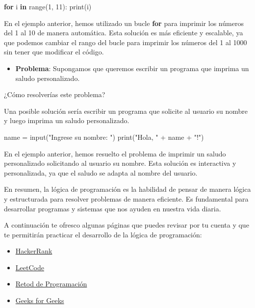\documentclass[
  a4paper,
  DIV=11,
  numbers=noendperiod,
  onepage,
  openany]{scrreprt}
\newenvironment{Shaded}{\begin{snugshade}}{\end{snugshade}}
\newcommand{\BuiltInTok}[1]{\textcolor[rgb]{0.00,0.23,0.31}{#1}}
\newcommand{\ControlFlowTok}[1]{\textcolor[rgb]{0.00,0.23,0.31}{\textbf{#1}}}
\newcommand{\DecValTok}[1]{\textcolor[rgb]{0.68,0.00,0.00}{#1}}
\newcommand{\KeywordTok}[1]{\textcolor[rgb]{0.00,0.23,0.31}{\textbf{#1}}}
\newcommand{\NormalTok}[1]{\textcolor[rgb]{0.00,0.23,0.31}{#1}}
\newcommand{\OperatorTok}[1]{\textcolor[rgb]{0.37,0.37,0.37}{#1}}
\newcommand{\StringTok}[1]{\textcolor[rgb]{0.13,0.47,0.30}{#1}}
\providecommand{\tightlist}{%
  \setlength{\itemsep}{0pt}\setlength{\parskip}{0pt}}\usepackage{longtable,booktabs,array}
\begin{document}
\begin{Shaded}
\begin{Highlighting}[]
\ControlFlowTok{for}\NormalTok{ i }\KeywordTok{in} \BuiltInTok{range}\NormalTok{(}\DecValTok{1}\NormalTok{, }\DecValTok{11}\NormalTok{):}
    \BuiltInTok{print}\NormalTok{(i)}
\end{Highlighting}
\end{Shaded}

En el ejemplo anterior, hemos utilizado un bucle \textbf{for} para
imprimir los números del 1 al 10 de manera automática. Esta solución es
más eficiente y escalable, ya que podemos cambiar el rango del bucle
para imprimir los números del 1 al 1000 sin tener que modificar el
código.

\begin{itemize}
\tightlist
\item
  \textbf{Problema}: Supongamos que queremos escribir un programa que
  imprima un saludo personalizado.
\end{itemize}

¿Cómo resolverías este problema?

Una posible solución sería escribir un programa que solicite al usuario
su nombre y luego imprima un saludo personalizado.

\begin{Shaded}
\begin{Highlighting}[]
\NormalTok{name }\OperatorTok{=} \BuiltInTok{input}\NormalTok{(}\StringTok{"Ingrese su nombre: "}\NormalTok{)}
\BuiltInTok{print}\NormalTok{(}\StringTok{"Hola, "} \OperatorTok{+}\NormalTok{ name }\OperatorTok{+} \StringTok{"!"}\NormalTok{)}
\end{Highlighting}
\end{Shaded}

En el ejemplo anterior, hemos resuelto el problema de imprimir un saludo
personalizado solicitando al usuario su nombre. Esta solución es
interactiva y personalizada, ya que el saludo se adapta al nombre del
usuario.

En resumen, la lógica de programación es la habilidad de pensar de
manera lógica y estructurada para resolver problemas de manera
eficiente. Es fundamental para desarrollar programas y sistemas que nos
ayuden en nuestra vida diaria.

A continuación te ofresco algunas páginas que puedes revisar por tu
cuenta y que te permitirán practicar el desarrollo de la lógica de
programación:

\begin{itemize}
\tightlist
\item
  \href{https://www.hackerrank.com/}{HackerRank}
\item
  \href{https://leetcode.com/}{LeetCode}
\item
  \href{https://retosdeprogramacion.com}{Retod de Programación}
\item
  \href{https://www.geeksforgeeks.org/}{Geeks for Geeks}
\end{itemize}
\end{document}
